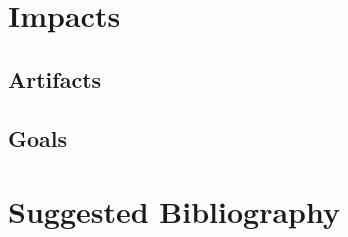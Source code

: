 \documentclass[a4paper,man,natbib]{apa6}
\begin{document}
   \section*{Impacts}
   \subsection*{Artifacts}
   \subsection*{Goals}
   \clearpage
   \section{Suggested Bibliography}
\end{document}
